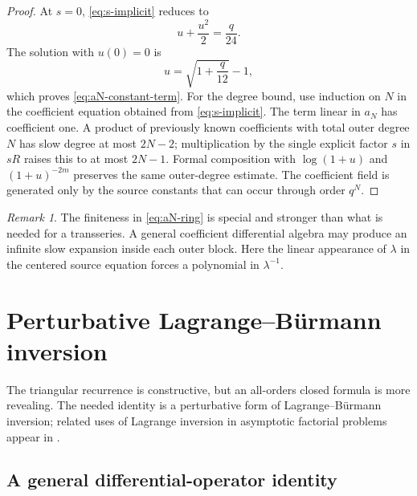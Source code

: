 \documentclass[11pt,oneside]{article}
\theoremstyle{plain}
\theoremstyle{definition}
\theoremstyle{remark}
\newtheorem{remark}[theorem]{Remark}
\begin{document}
\begin{proof}
At \(s=0\), \cref{eq:s-implicit} reduces to
\begin{equation}
 u+\frac{u^2}{2}=\frac q{24}.
\end{equation}
The solution with \(u(0)=0\) is
\begin{equation}
 u=\sqrt{1+\frac q{12}}-1,
 \label{eq:u-szero}
\end{equation}
which proves \cref{eq:aN-constant-term}.  For the degree bound, use induction
on \(N\) in the coefficient equation obtained from
\cref{eq:s-implicit}.  The term linear in \(a_N\) has coefficient one.  A
product of previously known coefficients with total outer degree \(N\) has
slow degree at most \(2N-2\); multiplication by the single explicit factor
\(s\) in \(sR\) raises this to at most \(2N-1\).  Formal composition with
\(\log(1+u)\) and \((1+u)^{-2m}\) preserves the same outer-degree estimate.
The coefficient field is generated only by the source constants that can occur
through order \(q^N\).
\end{proof}

\begin{remark}
The finiteness in \cref{eq:aN-ring} is special and stronger than what is needed
for a transseries.  A general coefficient differential algebra may produce an
infinite slow expansion inside each outer block.  Here the linear appearance of
\(\lambda\) in the centered source equation forces a polynomial in
\(\lambda^{-1}\).
\end{remark}

\section{Perturbative Lagrange--B\"urmann inversion}
\label{sec:Lagrange}

The triangular recurrence is constructive, but an all-orders closed formula is
more revealing.  The needed identity is a perturbative form of
Lagrange--B\"urmann inversion; related uses of Lagrange inversion in
asymptotic factorial problems appear in \cite{BrassescoMendez2011}.

\subsection{A general differential-operator identity}
\end{document}
